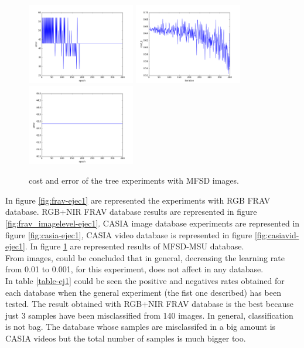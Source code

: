 \begin{figure}[htb]
\includegraphics[width=0.42\textwidth]{images/redes/ejecucion1/general_svm_mfsd/minidataset_tested_itself/error.png}
\includegraphics[width=0.42\textwidth]{images/redes/ejecucion1/general_svm_mfsd/minidataset_tested_iteself_lr_0_001/cost.png}
\includegraphics[width=0.42\textwidth]{images/redes/ejecucion1/general_svm_mfsd/minidataset_tested_iteself_lr_0_001/error.png}
\caption{cost and error of the tree experiments with MFSD images.} \label{fig:mfsd-ejec1}
\end{figure}

In figure \ref{fig:frav-ejec1} are represented the experiments with RGB FRAV database. RGB+NIR FRAV database results are represented in figure \ref{fig:frav_imagelevel-ejec1}. CASIA image database experiments are represented in figure  \ref{fig:casia-ejec1}, CASIA video database is represented in figure \ref{fig:casiavid-ejec1}. In figure \ref{fig:mfsd-ejec1} are represented results of MFSD-MSU database.\\

From images, could be concluded that in general, decreasing the learning rate from 0.01 to 0.001, for this experiment, does not affect in any database.\\

In table \ref{table-ej1} could be seen the positive and negatives rates obtained for each database when the general experiment (the fist one described) has been tested. The result obtained with RGB+NIR FRAV database is the best because just 3 samples have been misclassified from 140 images. In general, classification is not bag. The database whose samples are misclassifed in a big amount is CASIA videos but the total number of samples is much bigger too.\\

